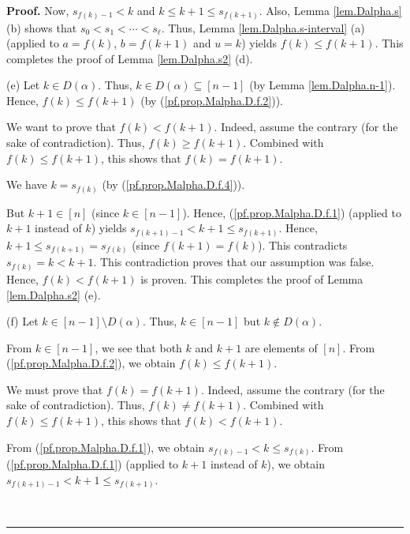 \documentclass[numbers=enddot,12pt,final,onecolumn,notitlepage,abstracton]{scrartcl}
\theoremstyle{definition}
\newenvironment{proof}[1][Proof]{\noindent\textbf{#1.} }{\ \rule{0.5em}{0.5em}}
\newenvironment{verlong}{}{}
\begin{document}
\begin{verlong}
\begin{footnotesize}
\begin{proof}
Now, $s_{f\left(  k\right)  -1}<k$ and $k\leq k+1\leq s_{f\left(  k+1\right)
}$. Also, Lemma \ref{lem.Dalpha.s} (b) shows that $s_{0}<s_{1}<\cdots<s_{\ell
}$. Thus, Lemma \ref{lem.Dalpha.s-interval} (a) (applied to $a=f\left(
k\right)  $, $b=f\left(  k+1\right)  $ and $u=k$) yields $f\left(  k\right)
\leq f\left(  k+1\right)  $. This completes the proof of Lemma
\ref{lem.Dalpha.s2} (d).

(e) Let $k\in D\left(  \alpha\right)  $. Thus, $k\in D\left(  \alpha\right)
\subseteq\left[  n-1\right]  $ (by Lemma \ref{lem.Dalpha.n-1}). Hence,
$f\left(  k\right)  \leq f\left(  k+1\right)  $ (by
(\ref{pf.prop.Malpha.D.f.2})).

We want to prove that $f\left(  k\right)  <f\left(  k+1\right)  $. Indeed,
assume the contrary (for the sake of contradiction). Thus, $f\left(  k\right)
\geq f\left(  k+1\right)  $. Combined with $f\left(  k\right)  \leq f\left(
k+1\right)  $, this shows that $f\left(  k\right)  =f\left(  k+1\right)  $.

We have $k=s_{f\left(  k\right)  }$ (by (\ref{pf.prop.Malpha.D.f.4})).

But $k+1\in\left[  n\right]  $ (since $k\in\left[  n-1\right]  $). Hence,
(\ref{pf.prop.Malpha.D.f.1}) (applied to $k+1$ instead of $k$) yields
$s_{f\left(  k+1\right)  -1}<k+1\leq s_{f\left(  k+1\right)  }$. Hence,
$k+1\leq s_{f\left(  k+1\right)  }=s_{f\left(  k\right)  }$ (since $f\left(
k+1\right)  =f\left(  k\right)  $). This contradicts $s_{f\left(  k\right)
}=k<k+1$. This contradiction proves that our assumption was false. Hence,
$f\left(  k\right)  <f\left(  k+1\right)  $ is proven. This completes the
proof of Lemma \ref{lem.Dalpha.s2} (e).

(f) Let $k\in\left[  n-1\right]  \setminus D\left(  \alpha\right)  $. Thus,
$k\in\left[  n-1\right]  $ but $k\notin D\left(  \alpha\right)  $.

From $k\in\left[  n-1\right]  $, we see that both $k$ and $k+1$ are elements
of $\left[  n\right]  $. From (\ref{pf.prop.Malpha.D.f.2}), we obtain
$f\left(  k\right)  \leq f\left(  k+1\right)  $.

We must prove that $f\left(  k\right)  =f\left(  k+1\right)  $. Indeed, assume
the contrary (for the sake of contradiction). Thus, $f\left(  k\right)  \neq
f\left(  k+1\right)  $. Combined with $f\left(  k\right)  \leq f\left(
k+1\right)  $, this shows that $f\left(  k\right)  <f\left(  k+1\right)  $.

From (\ref{pf.prop.Malpha.D.f.1}), we obtain $s_{f\left(  k\right)  -1}<k\leq
s_{f\left(  k\right)  }$. From (\ref{pf.prop.Malpha.D.f.1}) (applied to $k+1$
instead of $k$), we obtain $s_{f\left(  k+1\right)  -1}<k+1\leq s_{f\left(
k+1\right)  }$.


\end{proof}
\end{footnotesize}
\end{verlong}
\end{document}
